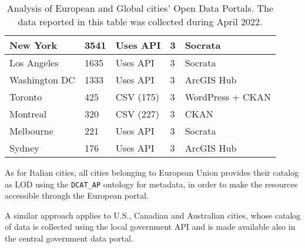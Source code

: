 \begin{table}[!ht]
\begin{tabular}{|lllll|}
    \multicolumn{1}{|l|}{New York}                    & \multicolumn{1}{|l|}{3541}                                             & \multicolumn{1}{|l|}{Uses \acs{API}}                                                  & \multicolumn{1}{|l|}{3}        & \multicolumn{1}{|l|}{Socrata}                                   \\ \hline
    \multicolumn{1}{|l|}{Los Angeles}                 & \multicolumn{1}{|l|}{1635}                                             & \multicolumn{1}{|l|}{Uses \acs{API}}                                                  & \multicolumn{1}{|l|}{3}        & \multicolumn{1}{|l|}{Socrata}                                   \\ \hline
    \multicolumn{1}{|l|}{Washington DC}               & \multicolumn{1}{|l|}{1333}                                             & \multicolumn{1}{|l|}{Uses \acs{API}}                                                  & \multicolumn{1}{|l|}{3}        & \multicolumn{1}{|l|}{ArcGIS Hub}                                   \\ \hline
    \multicolumn{1}{|l|}{Toronto}                     & \multicolumn{1}{|l|}{425}                                              & \multicolumn{1}{|l|}{CSV (175)}                                                       & \multicolumn{1}{|l|}{3}        & \multicolumn{1}{|l|}{WordPress + CKAN}                                   \\ \hline
    \multicolumn{1}{|l|}{Montreal}                    & \multicolumn{1}{|l|}{320}                                              & \multicolumn{1}{|l|}{CSV (227)}                                                       & \multicolumn{1}{|l|}{3}        & \multicolumn{1}{|l|}{CKAN}                                   \\ \hline
    \multicolumn{1}{|l|}{Melbourne}                   & \multicolumn{1}{|l|}{221}                                              & \multicolumn{1}{|l|}{Uses \acs{API}}                                                  & \multicolumn{1}{|l|}{3}        & \multicolumn{1}{|l|}{Socrata}                                   \\ \hline
    \multicolumn{1}{|l|}{Sydney}                      & \multicolumn{1}{|l|}{176}                                              & \multicolumn{1}{|l|}{Uses \acs{API}}                                                  & \multicolumn{1}{|l|}{3}        & \multicolumn{1}{|l|}{ArcGIS Hub}                                   \\ \hline
  \end{tabular}
  \caption{Analysis of European and Global cities' Open Data Portals. The data reported in this table was collected during April 2022.}
  \label{tab:other-cities}
\end{table}

As for Italian cities, all cities belonging to European Union provides their catalog as \acl{LOD} using the \verb#DCAT_AP# ontology for metadata, in order to make the resources accessible through the European portal.

A similar approach applies to U.S., Canadian and Australian cities, whose catalog of data is collected using the local government \acs{API} and is made available also in the central government data portal.